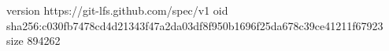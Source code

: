 version https://git-lfs.github.com/spec/v1
oid sha256:c030fb7478cd4d21343f47a2da03df8f950b1696f25da678c39ce41211f67923
size 894262
